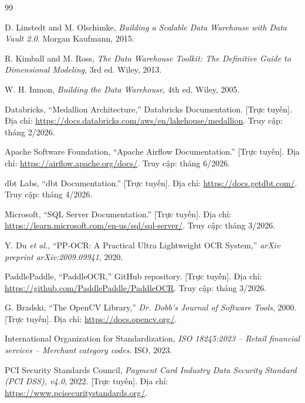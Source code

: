 \documentclass[oneside, a4paper]{book}
\theoremstyle{plain}
\theoremstyle{definition}
\theoremstyle{remark}
\renewcommand{\bibname}{Tài liệu tham khảo}
\begin{document}
\renewcommand{\bibname}{Tài liệu tham khảo}
\begin{thebibliography}{99}

D. Linstedt and M. Olschimke, \textit{Building a Scalable Data Warehouse with Data Vault 2.0}. Morgan Kaufmann, 2015.

R. Kimball and M. Ross, \textit{The Data Warehouse Toolkit: The Definitive Guide to Dimensional Modeling}, 3rd ed. Wiley, 2013.

W. H. Inmon, \textit{Building the Data Warehouse}, 4th ed. Wiley, 2005.

Databricks, ``Medallion Architecture,'' Databricks Documentation. [Trực tuyến]. Địa chỉ: \url{https://docs.databricks.com/aws/en/lakehouse/medallion}. Truy cập: tháng 2/2026.

Apache Software Foundation, ``Apache Airflow Documentation.'' [Trực tuyến]. Địa chỉ: \url{https://airflow.apache.org/docs/}. Truy cập: tháng 6/2026.

dbt Labs, ``dbt Documentation.'' [Trực tuyến]. Địa chỉ: \url{https://docs.getdbt.com/}. Truy cập: tháng 4/2026.

Microsoft, ``SQL Server Documentation.'' [Trực tuyến]. Địa chỉ: \url{https://learn.microsoft.com/en-us/sql/sql-server/}. Truy cập: tháng 3/2026.

Y. Du \textit{et al.}, ``PP-OCR: A Practical Ultra Lightweight OCR System,'' \textit{arXiv preprint arXiv:2009.09941}, 2020.

PaddlePaddle, ``PaddleOCR,'' GitHub repository. [Trực tuyến]. Địa chỉ: \url{https://github.com/PaddlePaddle/PaddleOCR}. Truy cập: tháng 3/2026.

G. Bradski, ``The OpenCV Library,'' \textit{Dr. Dobb's Journal of Software Tools}, 2000. [Trực tuyến]. Địa chỉ: \url{https://docs.opencv.org/}.

International Organization for Standardization, \textit{ISO 18245:2023 -- Retail financial services -- Merchant category codes}. ISO, 2023.

PCI Security Standards Council, \textit{Payment Card Industry Data Security Standard (PCI DSS), v4.0}, 2022. [Trực tuyến]. Địa chỉ: \url{https://www.pcisecuritystandards.org/}.

\end{thebibliography}
\end{document}
